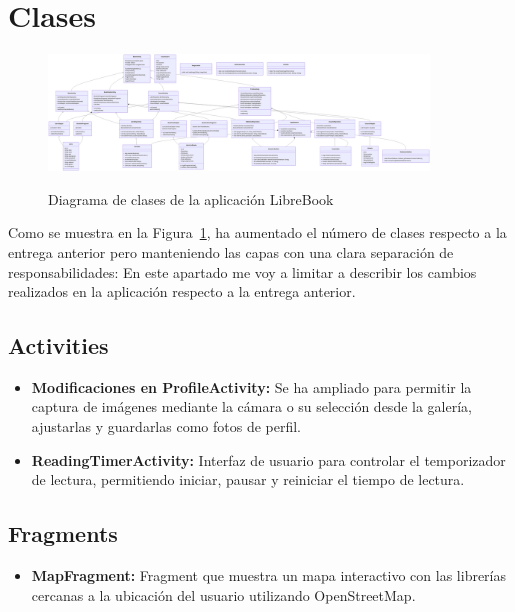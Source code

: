 \documentclass[a4paper,11pt]{report}
\begin{document}
    \section{Clases}
      \begin{figure}[H]
        \centering
        \href{https://raw.githubusercontent.com/Xabierland/DAS-Proyecto/refs/heads/main/Documentation/Memoria2/.img/diagrama-clases.svg}{%
          \includegraphics[width=0.9\textwidth]{.img/diagrama-clases.png}
        }
        \caption{Diagrama de clases de la aplicación LibreBook}
        \label{fig:diagrama-clases}
      \end{figure}
      Como se muestra en la Figura~\ref{fig:diagrama-clases}, ha aumentado el número de clases respecto a la entrega anterior pero manteniendo las capas con una clara separación de responsabilidades\cite{android_architecture}:
      En este apartado me voy a limitar a describir los cambios realizados en la aplicación respecto a la entrega anterior.
      \subsection{Activities}
        \begin{itemize}
          \item \textbf{Modificaciones en ProfileActivity:} Se ha ampliado para permitir la captura de imágenes mediante la cámara o su selección desde la galería, ajustarlas y guardarlas como fotos de perfil.
          \item \textbf{ReadingTimerActivity:} Interfaz de usuario para controlar el temporizador de lectura, permitiendo iniciar, pausar y reiniciar el tiempo de lectura.
        \end{itemize}
      \subsection{Fragments}
        \begin{itemize}
          \item \textbf{MapFragment:} Fragment que muestra un mapa interactivo con las librerías cercanas a la ubicación del usuario utilizando OpenStreetMap.
        \end{itemize}
\end{document}

